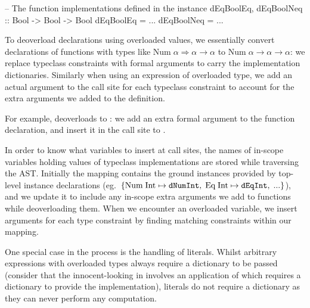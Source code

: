 \documentclass[dissertation.tex]{subfiles}
\begin{document}
{{\begin{haskellfigure}
        -- The function implementations defined in the instance
        dEqBoolEq, dEqBoolNeq :: Bool -> Bool -> Bool
        dEqBoolEq = ...
        dEqBoolNeq = ...
        \end{haskellfigure}

        To deoverload declarations using overloaded values, we essentially convert declarations of functions with types
        like \(\text{Num}\;\alpha\Rightarrow\alpha\rightarrow\alpha\) to
        \(\text{Num}\;\alpha\rightarrow\alpha\rightarrow\alpha\): we replace typeclass constraints with formal arguments
        to carry the implementation dictionaries. Similarly when using an expression of overloaded type, we add an
        actual argument to the call site for each typeclass constraint to account for the extra arguments we added to
        the definition.
        
        For example,  deoverloads to : we add an extra
        formal argument to the function declaration, and insert it in the call site to \haskell{(+)}.

        In order to know what variables to insert at call sites, the names of in-scope variables holding values of
        typeclass implementations are stored while traversing the AST. Initially the mapping contains the ground
        instances provided by top-level instance declarations (eg.\
        \(\{\text{Num\;Int}\mapsto\texttt{dNumInt},\;\text{Eq\;Int}\mapsto\texttt{dEqInt},\;...\}\)), and we update
        it to include any in-scope extra arguments we add to functions while deoverloading them. When we encounter
        an overloaded variable, we insert arguments for each type constraint by finding matching constraints within
        our mapping.

        One special case in the process is the handling of literals. Whilst arbitrary expressions with overloaded
        types always require a dictionary to be passed (consider that the innocent-looking \haskell{x} in
        \haskell{let x = 1 + 2 in x} involves an application of \haskell{(+)} which requires a dictionary to provide
        the implementation), literals do not require a dictionary as they can never perform any computation.

    }
}
\end{document}
